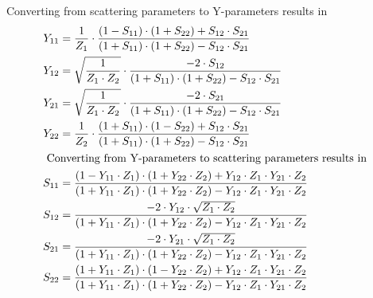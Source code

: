 Converting from scattering parameters to Y-parameters results in
\begin{align}
Y_{11} &= \dfrac{1}{Z_{1}}\cdot \dfrac{\left(1 - S_{11}\right)\cdot \left(1 + S_{22}\right) + S_{12}\cdot S_{21}}{\left(1 + S_{11}\right)\cdot \left(1 + S_{22}\right) - S_{12}\cdot S_{21}}\\
Y_{12} &= \sqrt{\dfrac{1}{Z_{1}\cdot Z_{2}}}\cdot \dfrac{-2\cdot S_{12}}{\left(1 + S_{11}\right)\cdot \left(1 + S_{22}\right) - S_{12}\cdot S_{21}}\\
Y_{21} &= \sqrt{\dfrac{1}{Z_{1}\cdot Z_{2}}}\cdot \dfrac{-2\cdot S_{21}}{\left(1 + S_{11}\right)\cdot \left(1 + S_{22}\right) - S_{12}\cdot S_{21}}\\
Y_{22} &= \dfrac{1}{Z_{2}}\cdot \dfrac{\left(1 + S_{11}\right)\cdot \left(1 - S_{22}\right) + S_{12}\cdot S_{21}}{\left(1 + S_{11}\right)\cdot \left(1 + S_{22}\right) - S_{12}\cdot S_{21}}\\
\intertext{
Converting from Y-parameters to scattering parameters results in
}
S_{11} &= \dfrac{\left(1 - Y_{11}\cdot Z_{1}\right)\cdot \left(1 + Y_{22}\cdot Z_{2}\right) + Y_{12}\cdot Z_{1}\cdot Y_{21}\cdot Z_{2}}{\left(1 + Y_{11}\cdot Z_{1}\right)\cdot \left(1 + Y_{22}\cdot Z_{2}\right) - Y_{12}\cdot Z_{1}\cdot Y_{21}\cdot Z_{2}}\\
S_{12} &= \dfrac{-2\cdot Y_{12}\cdot \sqrt{Z_{1}\cdot Z_{2}}}{\left(1 + Y_{11} \cdot Z_{1}\right)\cdot \left(1 + Y_{22}\cdot Z_{2}\right) - Y_{12}\cdot Z_{1}\cdot Y_{21}\cdot Z_{2}}\\
S_{21} &= \dfrac{-2\cdot Y_{21}\cdot \sqrt{Z_{1}\cdot Z_{2}}}{\left(1 + Y_{11} \cdot Z_{1}\right)\cdot \left(1 + Y_{22}\cdot Z_{2}\right) - Y_{12}\cdot Z_{1}\cdot Y_{21}\cdot Z_{2}}\\
S_{22} &= \dfrac{\left(1 + Y_{11}\cdot Z_{1}\right)\cdot \left(1 - Y_{22}\cdot Z_{2}\right) + Y_{12}\cdot Z_{1}\cdot Y_{21}\cdot Z_{2}}{\left(1 + Y_{11}\cdot Z_{1}\right)\cdot \left(1 + Y_{22}\cdot Z_{2}\right) - Y_{12}\cdot Z_{1}\cdot Y_{21}\cdot Z_{2}}
\end{align}

